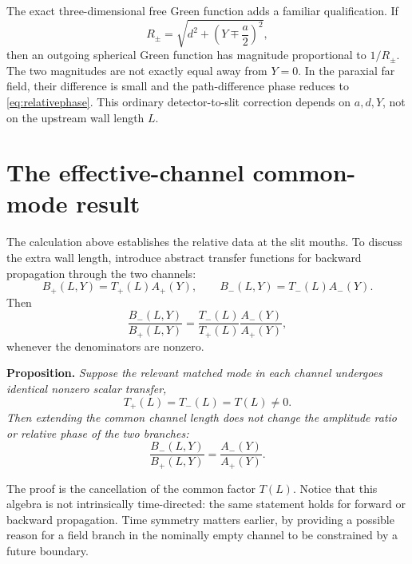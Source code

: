 \documentclass[11pt]{article}
\begin{document}
The exact three-dimensional free Green function adds a familiar qualification.  If
\begin{equation}
 R_\pm=\sqrt{d^2+\left(Y\mp\frac a2\right)^2},
\end{equation}
then an outgoing spherical Green function has magnitude proportional to $1/R_\pm$.  The two magnitudes are not exactly equal away from $Y=0$.  In the paraxial far field, their difference is small and the path-difference phase reduces to \eqref{eq:relativephase}.  This ordinary detector-to-slit correction depends on $a,d,Y$, not on the upstream wall length $L$.

\section{The effective-channel common-mode result}

The calculation above establishes the relative data at the slit mouths.  To discuss the extra wall length, introduce abstract transfer functions for backward propagation through the two channels:
\begin{equation}
 B_+(L,Y)=T_+(L)A_+(Y),
 \qquad
 B_-(L,Y)=T_-(L)A_-(Y).
 \label{eq:channeltransfer}
\end{equation}
Then
\begin{equation}
 \frac{B_-(L,Y)}{B_+(L,Y)}
 =\frac{T_-(L)}{T_+(L)}
 \frac{A_-(Y)}{A_+(Y)},
 \label{eq:generalratio}
\end{equation}
whenever the denominators are nonzero.

\medskip
\noindent\textbf{Proposition.}
\emph{Suppose the relevant matched mode in each channel undergoes identical nonzero scalar transfer,
\begin{equation}
 T_+(L)=T_-(L)=T(L)\neq0.
 \label{eq:scalartransfer}
\end{equation}
Then extending the common channel length does not change the amplitude ratio or relative phase of the two branches:}
\begin{equation}
 \frac{B_-(L,Y)}{B_+(L,Y)}
 =\frac{A_-(Y)}{A_+(Y)}.
 \label{eq:commoncancel}
\end{equation}

The proof is the cancellation of the common factor $T(L)$.  Notice that this algebra is not intrinsically time-directed: the same statement holds for forward or backward propagation.  Time symmetry matters earlier, by providing a possible reason for a field branch in the nominally empty channel to be constrained by a future boundary.
\end{document}
